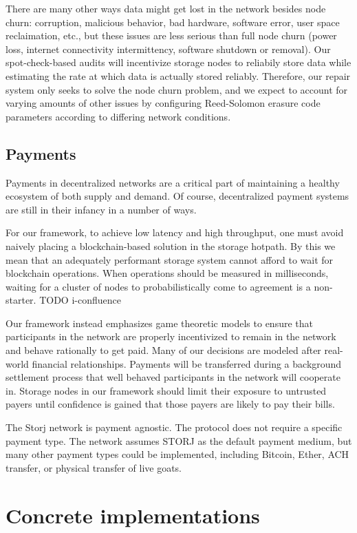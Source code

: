 \documentclass[a4paper,10pt]{article} \usepackage[utf8]{inputenc}
\newcommand{\todo}[1]{{\color{red} TODO #1 }}
\begin{document}
There are many other ways data might get lost in the network besides node churn:
corruption, malicious behavior, bad hardware, software error, user space
reclaimation, etc., but these issues are less serious than full node
churn (power loss, internet connectivity intermittency,
software shutdown or removal).
Our spot-check-based audits will incentivize storage nodes to reliabily store
data
while estimating the rate at which data is actually stored reliably.
Therefore, our repair system only seeks to solve the node churn problem, and
we expect to account for varying
amounts of other issues by configuring Reed-Solomon erasure code
parameters according to differing network conditions.

\subsection{Payments}

Payments in decentralized networks are a critical part of maintaining a healthy
ecosystem of both supply and demand. Of course, decentralized payment systems
are still in their infancy in a number of ways.

For our framework, to achieve low latency and high throughput, one must
avoid naively placing a blockchain-based solution in the storage hotpath.
By this we mean that an adequately performant storage system cannot afford to
wait for blockchain operations. When operations should be measured in
milliseconds, waiting for a cluster of nodes to probabilistically come to
agreement is a non-starter. \todo{i-confluence}

Our framework instead emphasizes game theoretic models to ensure
that participants in the network are properly incentivized to remain in the
network and behave rationally to get paid.
Many of our decisions are modeled after real-world financial relationships.
Payments will be transferred during
a background settlement process that well behaved participants in the network
will cooperate in. Storage nodes in our framework should limit their exposure
to untrusted payers until confidence is gained that those payers are likely
to pay their bills.

The Storj network is payment agnostic.
The protocol does not require a specific payment type.
The network assumes STORJ as the default payment medium, but many other payment
types could be implemented, including Bitcoin, Ether, ACH transfer, or physical
transfer of live goats.

\section{Concrete implementations}\label{sec:concrete}
\end{document}
